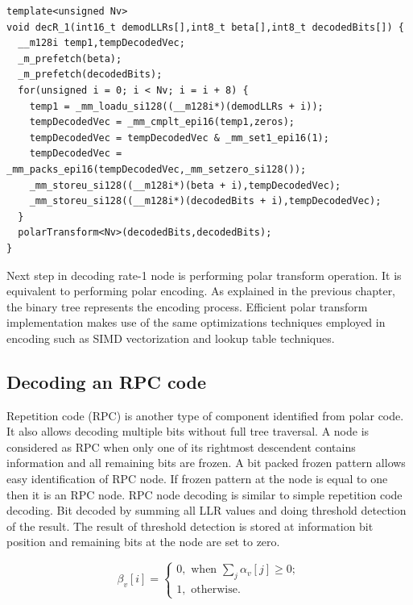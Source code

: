 \begin{code}
	\label{code:rateOneNodeDecoding}
	\begin{verbatim}
template<unsigned Nv>
void decR_1(int16_t demodLLRs[],int8_t beta[],int8_t decodedBits[]) {
  __m128i temp1,tempDecodedVec;
  _m_prefetch(beta);
  _m_prefetch(decodedBits);
  for(unsigned i = 0; i < Nv; i = i + 8) {
    temp1 = _mm_loadu_si128((__m128i*)(demodLLRs + i));
    tempDecodedVec = _mm_cmplt_epi16(temp1,zeros);
    tempDecodedVec = tempDecodedVec & _mm_set1_epi16(1);
    tempDecodedVec = _mm_packs_epi16(tempDecodedVec,_mm_setzero_si128());
    _mm_storeu_si128((__m128i*)(beta + i),tempDecodedVec);
    _mm_storeu_si128((__m128i*)(decodedBits + i),tempDecodedVec);
  }
  polarTransform<Nv>(decodedBits,decodedBits);
}
\end{verbatim}
\end{code}

Next step in decoding rate-1 node is performing polar transform operation. It is equivalent to performing polar encoding. As explained in the previous chapter, the binary tree represents the encoding process. Efficient polar transform implementation makes use of the same optimizations techniques employed in encoding such as SIMD vectorization and lookup table techniques.

\subsection{Decoding an RPC code}
Repetition code (RPC) is another type of component identified from polar code. It also allows decoding multiple bits without full tree traversal. A node is considered as RPC when only one of its rightmost descendent contains information and all remaining bits are frozen. A bit packed frozen pattern allows easy identification of RPC node. If frozen pattern at the node is equal to one then it is an RPC node. RPC node decoding is similar to simple repetition code decoding. Bit decoded by summing all LLR values and doing threshold detection of the result.  The result of threshold detection is stored at information bit position and remaining bits at the node are set to zero.

\begin{equation*}
 \beta_{v}[i] = \begin{cases}
				0, \text{ when $\sum_{j} \alpha_{v}[j] \geq 0 ;$}  \\
				1, \text{ otherwise.}
				\end{cases}
\end{equation*}

